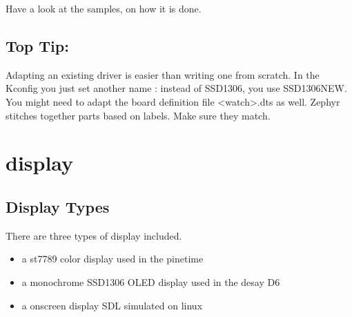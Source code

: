 \documentclass[letterpaper,10pt,english]{sphinxmanual}
\begin{document}
Have a look at the samples, on how it is done.

\begin{sphinxVerbatim}[commandchars=\\\{\}]
            
           
   
      
\end{sphinxVerbatim}


\section{Top Tip:}
\label{\detokenize{out-of-tree:top-tip}}
Adapting an existing driver is easier than writing one from scratch.
In the Kconfig you just set another name : instead of SSD1306, you use SSD1306NEW.
You might need to adapt the board definition file \textless{}watch\textgreater{}.dts as well.
Zephyr stitches together parts based on labels. Make sure they match.


\chapter{display}
\label{\detokenize{display:display}}\label{\detokenize{display:display-sample}}\label{\detokenize{display::doc}}

\section{Display   Types}
\label{\detokenize{display:display-types}}
There are three types of display included.
\begin{itemize}
\item {} 
a st7789 color display used in the pinetime

\item {} 
a monochrome SSD1306 OLED display used in the desay D6

\item {} 
a on\sphinxhyphen{}screen display SDL simulated on linux

\end{itemize}
\end{document}
